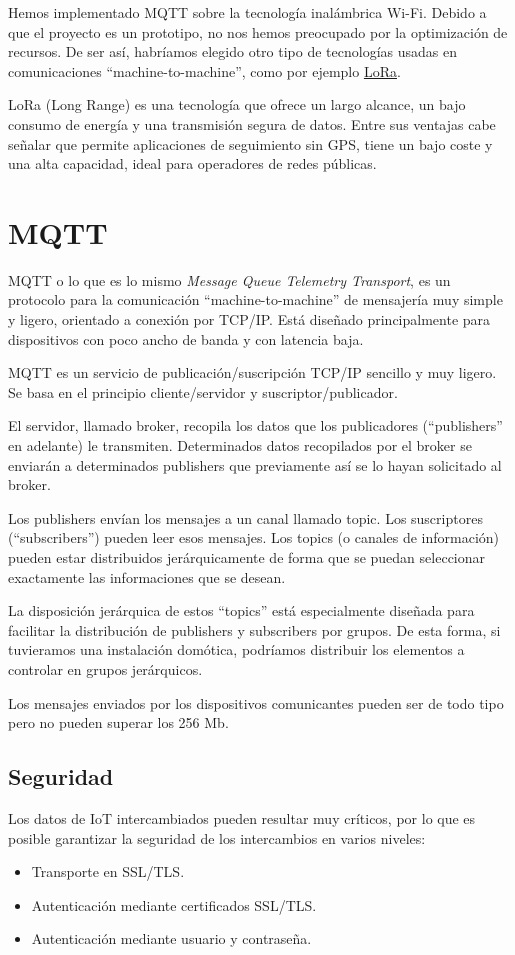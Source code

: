 Hemos implementado MQTT sobre la tecnología inalámbrica Wi-Fi. Debido a que el proyecto es un prototipo, no nos hemos preocupado por la optimización de recursos. De ser así, habríamos elegido otro tipo de tecnologías usadas en comunicaciones ``machine-to-machine'', como por ejemplo \href{https://www.lora-alliance.org/What-Is-LoRa/Technology}{LoRa}.

 LoRa (Long Range) es una tecnología que ofrece un largo alcance, un bajo consumo de energía y una transmisión segura de datos. Entre sus ventajas cabe señalar que permite aplicaciones de seguimiento sin GPS, tiene un bajo coste y una alta capacidad, ideal para operadores de redes públicas.

\section{MQTT}
\label{makereference3.2}
MQTT o lo que es lo mismo \textit{Message Queue Telemetry Transport}, es un protocolo para la comunicación ``machine-to-machine'' de mensajería muy simple y ligero, orientado a conexión por TCP/IP. Está diseñado principalmente para dispositivos con poco ancho de banda y con latencia baja.

MQTT es un servicio de publicación/suscripción TCP/IP sencillo y muy ligero. Se basa en el principio cliente/servidor y suscriptor/publicador.

El servidor, llamado broker, recopila los datos que los publicadores (``publishers'' en adelante) le transmiten. Determinados datos recopilados por el broker se enviarán a determinados publishers que previamente así se lo hayan solicitado al broker.

Los publishers envían los mensajes a un canal llamado topic. Los suscriptores (``subscribers'') pueden leer esos mensajes. Los topics (o canales de información) pueden estar distribuidos jerárquicamente de forma que se puedan seleccionar exactamente las informaciones que se desean.

La disposición jerárquica de estos ``topics'' está especialmente diseñada para facilitar la distribución de publishers y subscribers por grupos. De esta forma, si tuvieramos una instalación domótica, podríamos distribuir los elementos a controlar en grupos jerárquicos.

Los mensajes enviados por los dispositivos comunicantes pueden ser de todo tipo pero no pueden superar los 256 Mb.

\subsection{Seguridad}
Los datos de IoT intercambiados pueden resultar muy críticos, por lo que es posible garantizar la seguridad de los intercambios en varios niveles:
\begin{itemize}
\item Transporte en SSL/TLS.
\item Autenticación mediante certificados SSL/TLS.
\item Autenticación mediante usuario y contraseña.
\end{itemize}

